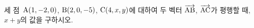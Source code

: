 세 점~$\mathrm{A}(1{,}\mkern3mu\mathopen{}-2{,}\mkern3mu\mathopen{}0)$, $\mathrm{B}(2{,}\mkern3mu\mathopen{}0{,}\mkern3mu\mathopen{}-5)$, $\mathrm{C}(4{,}\mkern3mu\mathopen{}x{,}\mkern3mu\mathopen{}y)$에 대하여 두 벡터 $\overrightarrow{\mathrm{AB}}$, $\overrightarrow{\mathrm{AC}}$가 평행할 때, $x+y$의 값을 구하시오.
